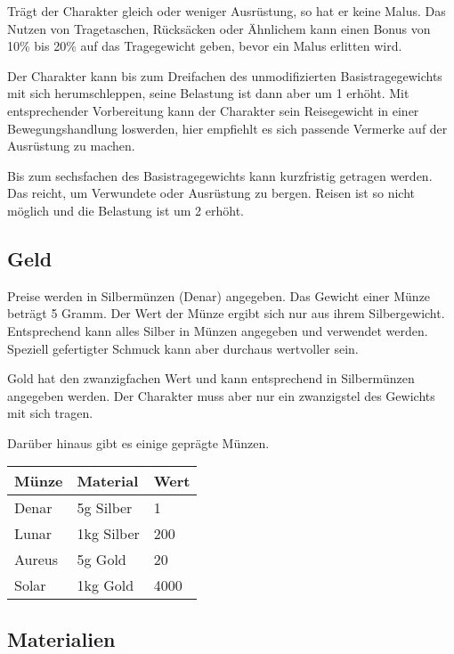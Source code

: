 \documentclass{article}
\begin{document}
Trägt der Charakter gleich oder weniger Ausrüstung, so hat er keine Malus. Das Nutzen von Tragetaschen, Rücksäcken
oder Ähnlichem kann einen Bonus von 10\% bis 20\% auf das Tragegewicht geben, bevor ein Malus erlitten wird.

Der Charakter kann bis zum Dreifachen des unmodifizierten Basistragegewichts mit sich herumschleppen, seine Belastung
ist dann aber um 1 erhöht. Mit entsprechender Vorbereitung kann der Charakter sein Reisegewicht in einer
Bewegungshandlung loswerden, hier empfiehlt es sich passende Vermerke auf der Ausrüstung zu machen.

Bis zum sechsfachen des Basistragegewichts kann kurzfristig getragen werden. Das reicht, um Verwundete oder Ausrüstung
zu bergen. Reisen ist so nicht möglich und die Belastung ist um 2 erhöht.

\begin{center}
\subsection{Geld}
\end{center}

Preise werden in Silbermünzen (Denar) angegeben. Das Gewicht einer Münze beträgt 5 Gramm. Der Wert der Münze ergibt sich
nur aus ihrem Silbergewicht. Entsprechend kann alles Silber in Münzen angegeben und verwendet werden. Speziell
gefertigter Schmuck kann aber durchaus wertvoller sein.

Gold hat den zwanzigfachen Wert und kann entsprechend in Silbermünzen angegeben werden. Der Charakter muss aber nur
ein zwanzigstel des Gewichts mit sich tragen.

Darüber hinaus gibt es einige geprägte Münzen.


\begin{small}
\begin{tabular}{|m{2cm}|m{2cm}|m{2cm}|}
\hline
\textbf{Münze}&\textbf{Material}&\textbf{Wert}\\
\hline
\hline
Denar&5g Silber&1\\
\hline
Lunar&1kg Silber&200\\
\hline
Aureus&5g Gold&20\\
\hline
Solar&1kg Gold&4000\\
\hline
\end{tabular}
\end{small}

\begin{center}
\subsection{Materialien}
\end{center}
\end{document}
